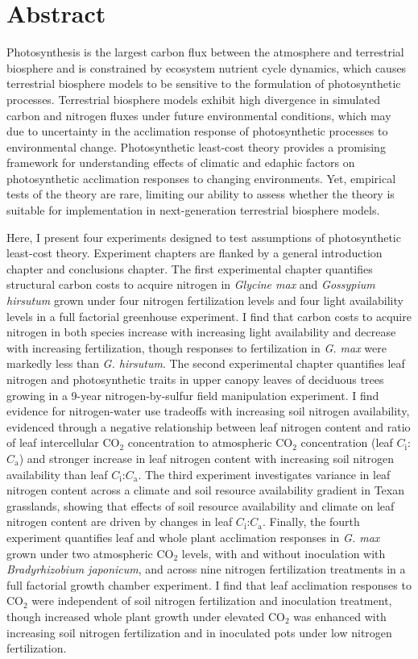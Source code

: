 \documentclass{ttuthes2007}
\begin{document}
\chapter{\textbf{Abstract}}
\noindent Photosynthesis is the largest carbon flux between the atmosphere and terrestrial biosphere and is constrained by ecosystem nutrient cycle dynamics, which causes terrestrial biosphere models to be sensitive to the formulation of photosynthetic processes. Terrestrial biosphere models exhibit high divergence in simulated carbon and nitrogen fluxes under future environmental conditions, which may due to uncertainty in the acclimation response of photosynthetic processes to environmental change. Photosynthetic least-cost theory provides a promising framework for understanding effects of climatic and edaphic factors on photosynthetic acclimation responses to changing environments. Yet, empirical tests of the theory are rare, limiting our ability to assess whether the theory is suitable for implementation in next-generation terrestrial biosphere models.

Here, I present four experiments designed to test assumptions of photosynthetic least-cost theory. Experiment chapters are flanked by a general introduction chapter and conclusions chapter. The first experimental chapter quantifies structural carbon costs to acquire nitrogen in \textit{Glycine max} and \textit{Gossypium hirsutum} grown under four nitrogen fertilization levels and four light availability levels in a full factorial greenhouse experiment. I find that carbon costs to acquire nitrogen in both species increase with increasing light availability and decrease with increasing fertilization, though responses to fertilization in \textit{G. max} were markedly less than \textit{G. hirsutum}. The second experimental chapter quantifies leaf nitrogen and photosynthetic traits in upper canopy leaves of deciduous trees growing in a 9-year nitrogen-by-sulfur field manipulation experiment. I find evidence for nitrogen-water use tradeoffs with increasing soil nitrogen availability, evidenced through a negative relationship between leaf nitrogen content and ratio of leaf intercellular CO$_2$ concentration to atmospheric CO$_2$ concentration (leaf $C_\mathrm{i}$:$C_\mathrm{a}$) and stronger increase in leaf nitrogen content with increasing soil nitrogen availability than leaf $C_\mathrm{i}$:$C_\mathrm{a}$. The third experiment investigates variance in leaf nitrogen content across a climate and soil resource availability gradient in Texan grasslands, showing that effects of soil resource availability and climate on leaf nitrogen content are driven by changes in leaf $C_\mathrm{i}$:$C_\mathrm{a}$. Finally, the fourth experiment quantifies leaf and whole plant acclimation responses in \textit{G. max} grown under two atmospheric CO$_2$ levels, with and without inoculation with \textit{Bradyrhizobium japonicum}, and across nine nitrogen fertilization treatments in a full factorial growth chamber experiment. I find that leaf acclimation responses to CO$_2$ were independent of soil nitrogen fertilization and inoculation treatment, though increased whole plant growth under elevated CO$_2$ was enhanced with increasing soil nitrogen fertilization and in inoculated pots under low nitrogen fertilization.
\end{document}

